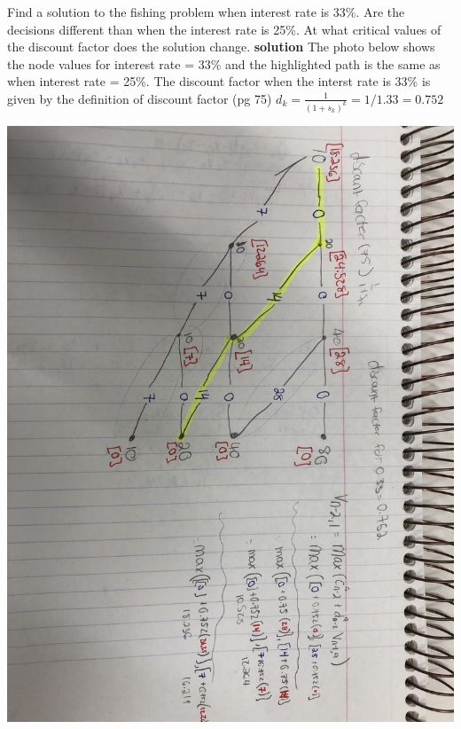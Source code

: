 \documentclass[12pt]{article}
\newenvironment{problem}[3][Problem]{\begin{trivlist}
\item[\hskip \labelsep {\bfseries #1}\hskip \labelsep {\bfseries #2.}]}{\end{trivlist}}
\begin{document}
\begin{problem}7. Find a solution to the fishing problem when interest rate is 33\%. Are the decisions different than when the interest rate is 25\%. At what critical values of the discount factor does the solution change. 
\textbf{solution} The photo below shows the node values for interest rate = 33\% and the highlighted path is the same as when interest rate = 25\%. The discount factor when the interst rate is 33\% is given by the definition of discount factor (pg 75) $ d_k = \frac{1}{(1+s_k)^k} = 1/1.33 = 0.752$ 
\begin{center}
\includegraphics[width=0.59\linewidth]{mod4p7.jpg}
\end{center}

\end{problem}
\end{document}
